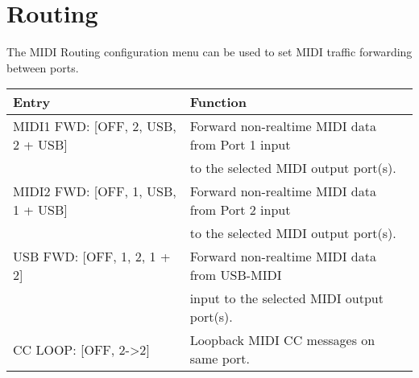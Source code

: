 \section{Routing}
The MIDI Routing configuration menu can be used to set MIDI traffic forwarding between ports.
\\
\begin{tabular}{|l|l|}
\hline
\rowcolor[HTML]{C0C0C0} 
Entry                                  & Function                                                                       \\ \hline
MIDI1 FWD: {[}OFF, 2, USB, 2 + USB{]}                & Forward non-realtime MIDI data from Port 1 input \\ & to the selected MIDI output port(s).                                                \\ \hline
MIDI2 FWD: {[}OFF, 1, USB, 1 + USB{]}                & Forward non-realtime MIDI data from Port 2 input \\ & to the selected MIDI output port(s).                                               \\ \hline
USB FWD: {[}OFF, 1, 2, 1 + 2{]}          & Forward non-realtime MIDI data from USB-MIDI \\ & input to the selected MIDI output port(s).                                            \\ \hline
CC LOOP: {[}OFF, 2->2{]}          & Loopback MIDI CC messages on same port.                                      \\ \hline
\end{tabular}


\newpage
